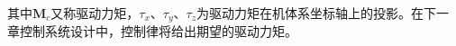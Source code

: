 其中$ \bm{M}_{c} $又称驱动力矩，$ \tau_{x } $、$ \tau_{y } $、$ \tau_{z } $为驱动力矩在机体系坐标轴上的投影。在下一章控制系统设计中，控制律将给出期望的驱动力矩。

